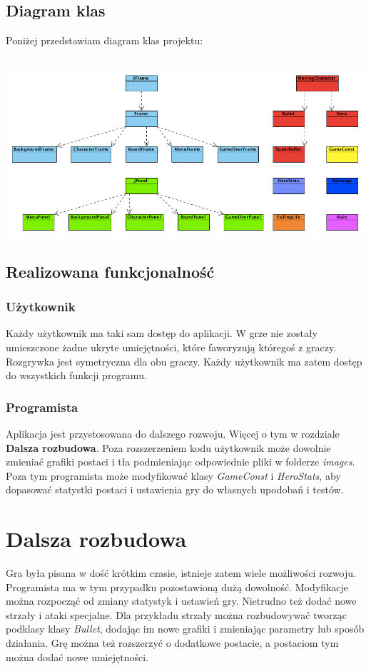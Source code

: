 \documentclass[a4paper,10pt]{article}
\begin{document}
\subsection{Diagram klas}
Poniżej przedstawiam diagram klas projektu: \\ \\
\begin{center}
\includegraphics[width=\textwidth]{klasy.png}
\end{center}
\subsection{Realizowana funkcjonalność}
\subsubsection{Użytkownik}
Każdy użytkownik ma taki sam dostęp do aplikacji. W grze nie zostały umieszczone żadne ukryte umiejętności, które faworyzują któregoś z graczy. Rozgrywka jest symetryczna dla obu graczy. Każdy użytkownik ma zatem dostęp do wszystkich funkcji programu.
\subsubsection{Programista}
Aplikacja jest przystosowana do dalszego rozwoju. Więcej o tym w rozdziale \textbf{Dalsza rozbudowa}. Poza rozszerzeniem kodu użytkownik może dowolnie zmieniać grafiki postaci i tła podmieniając odpowiednie pliki w folderze \textit{images}. Poza tym programista może modyfikować klasy \textit{GameConst} i \textit{HeroStats}, aby dopasować statystki postaci i ustawienia gry do własnych upodobań i testów.
\section{Dalsza rozbudowa}
Gra była pisana w dość krótkim czasie, istnieje zatem wiele możliwości rozwoju. Programista ma w tym przypadku pozostawioną dużą dowolność. Modyfikacje można rozpocząć od zmiany statystyk i ustawień gry. Nietrudno też dodać nowe strzały i ataki specjalne. Dla przykładu strzały można rozbudowywać tworząc podklasy klasy \textit{Bullet}, dodając im nowe grafiki i zmieniając parametry lub sposób działania. Grę można też rozszerzyć o dodatkowe postacie, a postaciom tym można dodać nowe umiejętności.
\end{document}
